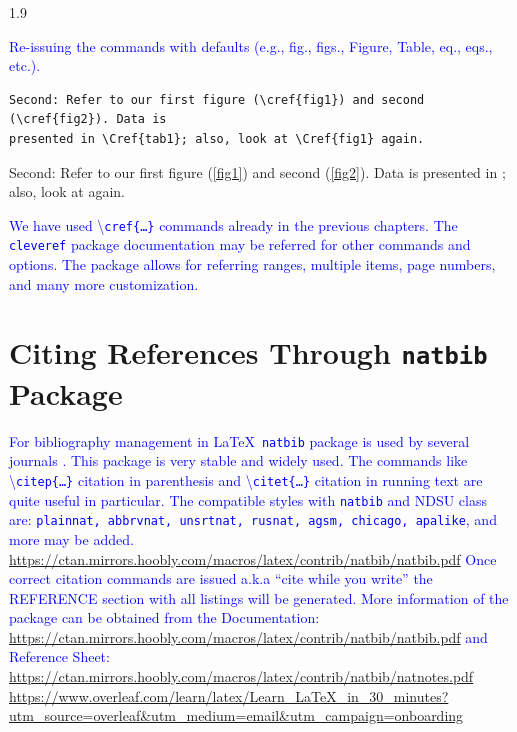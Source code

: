 \documentclass[phd]{ndsu-thesis-2022}
\newcommand\myspacing{1.9}      %
\newcommand\italk[1]{\textcolor{blue}{#1}}  %
\newcommand\cmd[1]{\textbackslash\texttt{#1}}  %
\newcommand\vb[1]{\textcolor{blue}{\texttt{#1}}}%
\begin{document}
\begin{spacing}{\myspacing}

\italk{Re-issuing the commands with defaults (e.g., fig., figs., Figure, Table, eq., eqs., etc.).}


{\singlespacing
\begin{verbatim}
Second: Refer to our first figure (\cref{fig1}) and second (\cref{fig2}). Data is 
presented in \Cref{tab1}; also, look at \Cref{fig1} again. 
\end{verbatim}
}
Second: Refer to our first figure (\cref{fig1}) and second (\cref{fig2}). Data is presented in ; also, look at  again. 

\italk{We have used \cmd{cref\{\ldots\}} commands already in the previous chapters. The \vb{cleveref} package documentation may be referred for other commands and options. The package allows for referring ranges, multiple items, page numbers, and many more customization.  
}



\section{Citing References Through \texttt{natbib} Package}
\italk{For bibliography management in \LaTeX\ \texttt{natbib} package is used by several journals \citep{daly2010natural}. This package is very stable and widely used. The commands like \cmd{citep\{\ldots\}} citation in parenthesis and \cmd{citet\{\ldots\}} citation in running text are quite useful in particular. The compatible styles with \texttt{natbib} and NDSU class are:  \texttt{plainnat, abbrvnat, unsrtnat, rusnat, agsm, chicago, apalike}, and more may be added. \url{https://ctan.mirrors.hoobly.com/macros/latex/contrib/natbib/natbib.pdf} Once correct citation commands are issued a.k.a ``cite while you write'' the REFERENCE section with all listings will be generated. More information of the package can be obtained from the Documentation: \textcolor{magenta}{\url{https://ctan.mirrors.hoobly.com/macros/latex/contrib/natbib/natbib.pdf}} and Reference Sheet: \!\!\textcolor{magenta}{\url{https://ctan.mirrors.hoobly.com/macros/latex/contrib/natbib/natnotes.pdf}}
\textcolor{magenta}{\url{https://www.overleaf.com/learn/latex/Learn_LaTeX_in_30_minutes?utm_source=overleaf&utm_medium=email&utm_campaign=onboarding}}}



\end{spacing}
\end{document}
